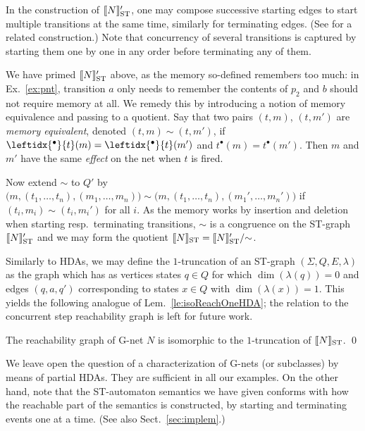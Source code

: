 \documentclass[runningheads,envcountsame]{llncs}
\newcommand*\prepla[1]{\leftidx{^\bullet}{#1}}
\newcommand*\pospla[1]{#1^\bullet}
\newcommand*\sem[1]{\llbracket #1\rrbracket}
\newcommand*\ST{\textup{ST}}
\begin{document}
\begin{remark}
  In the construction of $\sem{N}_\ST'$, one may compose successive starting edges to start multiple transitions at the same time,
  similarly for terminating edges.  (See \cite[Sect.~4.4]{conf/ramics/AmraneBCFZ24} for a related construction.)
  Note that concurrency of several transitions is captured
  by starting them one by one in any order before terminating any of them.
\end{remark}

We have primed $\sem{N}_\ST'$ above, as the memory so-defined remembers too much:
in Ex.~\ref{ex:pnt}, transition $a$ only needs to remember the contents of $p_2$ and $b$ should not require memory at all.
We remedy this by introducing a notion of memory equivalence and passing to a quotient.
Say that two pairs $(t, m)$, $(t, m')$ are \emph{memory equivalent},
denoted $(t, m)\sim (t, m')$, if $\prepla{t}(m)=\prepla{t}(m')$ and $\pospla{t}(m)=\pospla{t}(m')$.
Then $m$ and $m'$ have the same \emph{effect} on the net when $t$ is fired.

Now extend $\sim$ to $Q'$ by
$\big(m, (t_1,\dots, t_n), (m_1,\dots, m_n)\big)\sim \big(m, (t_1,\dots, t_n), (m_1',\dots, m_n')\big)$
if $(t_i, m_i)\sim (t_i, m_i')$ for all $i$.
As the memory works by insertion and deletion when starting resp.\ terminating transitions,
$\sim$ is a congruence on the ST-graph $\sem{N}_\ST'$ and we may form the quotient $\sem{N}_\ST=\sem{N}_\ST'/{\sim}$.

Similarly to HDAs, we may define the $1$-truncation of an ST-graph $(\Sigma, Q, E, \lambda)$
as the graph which has as vertices states $q\in Q$ for which $\dim(\lambda(q))=0$
and edges $(q, a, q')$ corresponding to states $x\in Q$ with $\dim(\lambda(x))=1$.
This yields the following analogue of Lem.~\ref{le:isoReachOneHDA};
the relation to the concurrent step reachability graph is
left for future work.

\begin{lemma}
  \label{lem:gnetssta}
  The reachability graph of G-net $N$ is isomorphic to the $1$-trun\-ca\-tion of $\sem{N}_\ST$. \qed
\end{lemma}

We leave open the question of a characterization of G-nets (or subclasses) by means of partial HDAs.
They are sufficient in all our examples.
On the other hand, 
note that the ST-automaton semantics we have given conforms with how the reachable part of the semantics is constructed,
by starting and terminating events one at a time.
(See also Sect.~\ref{sec:implem}.)
\end{document}
